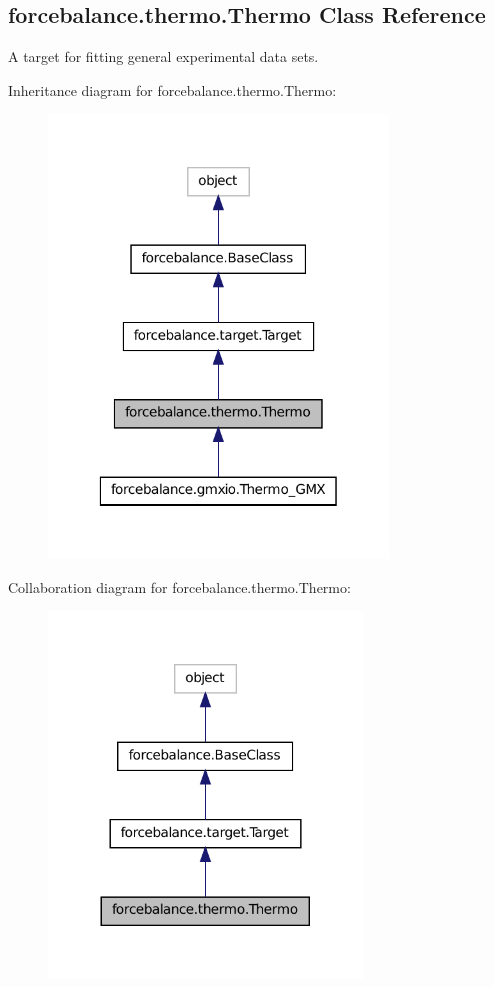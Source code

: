\hypertarget{classforcebalance_1_1thermo_1_1Thermo}{\subsection{forcebalance.\-thermo.\-Thermo Class Reference}
\label{classforcebalance_1_1thermo_1_1Thermo}
}


A target for fitting general experimental data sets.  




Inheritance diagram for forcebalance.\-thermo.\-Thermo\-:
\nopagebreak
\begin{figure}[H]
\begin{center}
\leavevmode
\includegraphics[width=256pt]{classforcebalance_1_1thermo_1_1Thermo__inherit__graph}
\end{center}
\end{figure}


Collaboration diagram for forcebalance.\-thermo.\-Thermo\-:
\nopagebreak
\begin{figure}[H]
\begin{center}
\leavevmode
\includegraphics[width=236pt]{classforcebalance_1_1thermo_1_1Thermo__coll__graph}
\end{center}
\end{figure}

